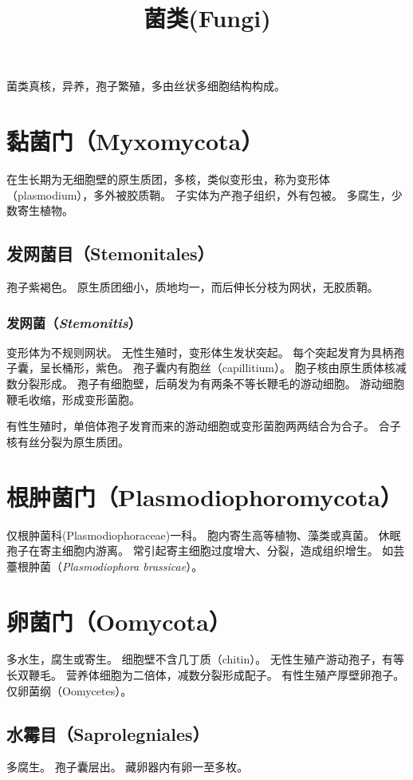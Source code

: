 \documentclass[11pt]{article}
\title{菌类(Fungi)}
\date{}
\begin{document}
  \maketitle

  \linenumbers
菌类真核，异养，孢子繁殖，多由丝状多细胞结构构成。

\section{黏菌门（Myxomycota）}
在生长期为无细胞壁的原生质团，多核，类似变形虫，称为变形体（plasmodium），多外被胶质鞘。
子实体为产孢子组织，外有包被。
多腐生，少数寄生植物。

\subsection{发网菌目（Stemonitales）}
孢子紫褐色。
原生质团细小，质地均一，而后伸长分枝为网状，无胶质鞘。


\subsubsection{发网菌（\textit{Stemonitis}）}
变形体为不规则网状。
无性生殖时，变形体生发状突起。
每个突起发育为具柄孢子囊，呈长桶形，紫色。
孢子囊内有胞丝（capillitium）。
胞子核由原生质体核减数分裂形成。
孢子有细胞壁，后萌发为有两条不等长鞭毛的游动细胞。
游动细胞鞭毛收缩，形成变形菌胞。

\par

有性生殖时，单倍体孢子发育而来的游动细胞或变形菌胞两两结合为合子。
合子核有丝分裂为原生质团。

\section{根肿菌门（Plasmodiophoromycota）}
仅根肿菌科(Plasmodiophoraceae)一科。
胞内寄生高等植物、藻类或真菌。
休眠孢子在寄主细胞内游离。
常引起寄主细胞过度增大、分裂，造成组织增生。
如芸薹根肿菌（\textit{Plasmodiophora brassicae}）。

\section{卵菌门（Oomycota）}
多水生，腐生或寄生。
细胞壁不含几丁质（chitin）。
无性生殖产游动孢子，有等长双鞭毛。
营养体细胞为二倍体，减数分裂形成配子。
有性生殖产厚壁卵孢子。
仅卵菌纲（Oomycetes）。

\subsection{水霉目（Saprolegniales）}
多腐生。
孢子囊层出。
藏卵器内有卵一至多枚。
\end{document}
